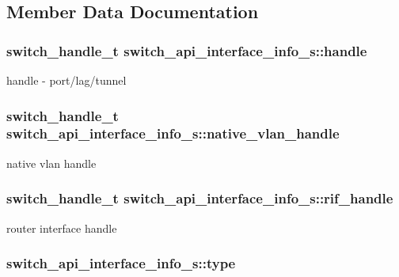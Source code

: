 \subsection{Member Data Documentation}
\hypertarget{structswitch__api__interface__info__s_a3da4493ff9c1f19c8b0462f6967cf2a8}{
\subsubsection[{handle}]{\setlength{\rightskip}{0pt plus 5cm}switch\+\_\+handle\+\_\+t switch\+\_\+api\+\_\+interface\+\_\+info\+\_\+s\+::handle}}\label{structswitch__api__interface__info__s_a3da4493ff9c1f19c8b0462f6967cf2a8}
handle -\/ port/lag/tunnel \hypertarget{structswitch__api__interface__info__s_a108c8a75675956fb8501fff211457a6b}{
\subsubsection[{native\+\_\+vlan\+\_\+handle}]{\setlength{\rightskip}{0pt plus 5cm}switch\+\_\+handle\+\_\+t switch\+\_\+api\+\_\+interface\+\_\+info\+\_\+s\+::native\+\_\+vlan\+\_\+handle}}\label{structswitch__api__interface__info__s_a108c8a75675956fb8501fff211457a6b}
native vlan handle \hypertarget{structswitch__api__interface__info__s_a599487b4808637df2c2cf36448748094}{
\subsubsection[{rif\+\_\+handle}]{\setlength{\rightskip}{0pt plus 5cm}switch\+\_\+handle\+\_\+t switch\+\_\+api\+\_\+interface\+\_\+info\+\_\+s\+::rif\+\_\+handle}}\label{structswitch__api__interface__info__s_a599487b4808637df2c2cf36448748094}
router interface handle \hypertarget{structswitch__api__interface__info__s_a8e9b5d65d2c2a6b6da18aa8a444b1b86}{
\subsubsection[{type}]{ switch\+\_\+api\+\_\+interface\+\_\+info\+\_\+s\+::type}}\label{structswitch__api__interface__info__s_a8e9b5d65d2c2a6b6da18aa8a444b1b86}
